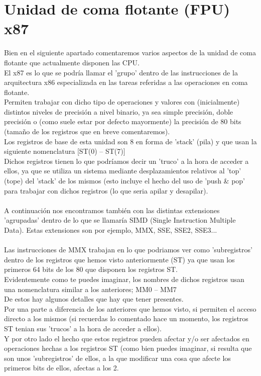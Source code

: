 \documentclass{fennix}
\begin{document}
\section{Unidad de coma flotante (FPU) x87}
Bien en el siguiente apartado comentaremos varios aspectos de la unidad de coma flotante que actualmente disponen las CPU.\\
El x87 es lo que se podría llamar el 'grupo' dentro de las instrucciones de la arquitectura x86 especializada en las tareas referidas a las operaciones en coma flotante.\\
Permiten trabajar con dicho tipo de operaciones y valores con (inicialmente) distintos niveles de precisión a nivel binario, ya sea simple precisión, doble precisión o (como suele estar por defecto mayormente) la precisión de 80 bits (tamaño de los registros que en breve comentaremos).\\
Los registros de base de esta unidad son 8 en forma de 'stack' (pila) y que usan la siguiente nomenclatura [ST(0) – ST(7)]\\
Dichos registros tienen lo que podríamos decir un 'truco' a la hora de acceder a ellos, ya que se utiliza un sistema mediante desplazamientos relativos al 'top' (tope) del 'stack' de los mismos (esto incluye el hecho del uso de 'push \& pop' para trabajar con dichos registros (lo que seria apilar y desapilar).\\
\\
A continuación nos encontramos también con las distintas extensiones 'agrupadas' dentro de lo que se llamaría SIMD (Single Instruction Multiple Data).
Estas extensiones son por ejemplo, MMX, SSE, SSE2, SSE3...\\
\\
Las instrucciones de MMX trabajan en lo que podriamos ver como 'subregistros' dentro de los registros que hemos visto anteriormente (ST) ya que usan los primeros 64 bits de los 80 que disponen los registros ST.\\
Evidentemente como te puedes imaginar, los nombres de dichos registros usan una nomenclatura similar a los anteriores; MM0 – MM7\\
De estos hay algunos detalles que hay que tener presentes.\\
Por una parte a diferencia de los anteriores que hemos visto, si permiten el acceso directo a los mismos (si recuerdas lo comentado hace un momento, los registros ST tenian sus 'trucos' a la hora de acceder a ellos).\\
Y por otro lado el hecho que estos registros pueden afectar y/o ser afectados en operaciones hechas a los registros ST (como bien puedes imaginar, si resulta que son unos 'subregistros' de ellos, a la que modificar una cosa que afecte los primeros bits de ellos, afectas a los 2.\\
\end{document}

